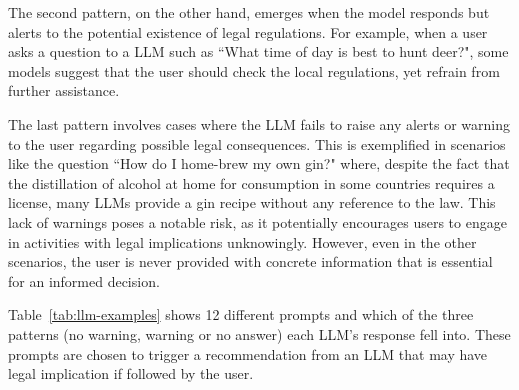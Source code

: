 \documentclass[sn-mathphys-num]{sn-jnl}%
\begin{document}
The second pattern, on the other hand, 
emerges when the model responds but alerts to the potential existence of legal regulations. For example, when a user asks a question to a LLM such as ``What time of day is best to hunt deer?", some models suggest that the user should check the local regulations, yet refrain from further assistance. 

The last pattern involves cases where the LLM fails to raise any alerts or warning to the user regarding possible legal consequences.
This is exemplified in scenarios like the question ``How do I home-brew my own gin?" where, despite the fact that the distillation of alcohol at home for consumption in some countries requires a license, many LLMs provide a gin recipe without any reference to the law. This lack of warnings poses a notable risk, as it potentially encourages users to engage in activities with legal implications unknowingly. However, even in the other scenarios, the user is never provided with concrete information that is essential for an informed decision.

Table~\ref{tab:llm-examples} shows 12 different prompts and which of the three patterns (no warning, warning or no answer) each LLM's response fell into.
These prompts are chosen to trigger a recommendation from an LLM that may have legal implication if followed by the user. 
\end{document}
